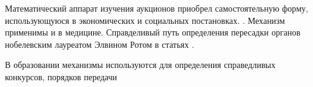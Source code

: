 Математический аппарат изучения аукционов приобрел самостоятельную форму, использующуюся в экономических и социальных постановках. \cite{milgrom1982theory}.  Механизм применимы и в медицине. Справделивый путь определения пересадки органов 
\cite{segev2005kidney} нобелевским лауреатом Элвином Ротом в статьях \cite{roth2005kidney}\cite{ashlagi2021kidney}.

В образовании механизмы используются для определения справедливых конкурсов, порядков передачи
